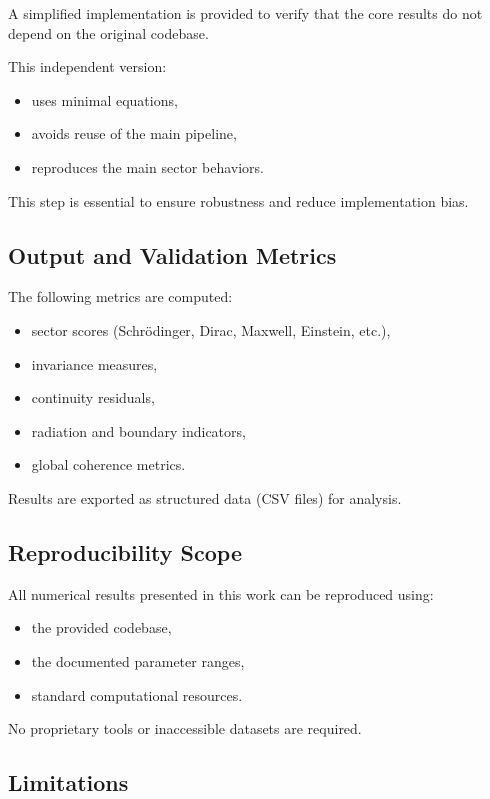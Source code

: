\documentclass[11pt]{article}
\begin{document}
A simplified implementation is provided to verify that the core results do not depend on the original codebase.

This independent version:

\begin{itemize}
\item uses minimal equations,
\item avoids reuse of the main pipeline,
\item reproduces the main sector behaviors.
\end{itemize}

This step is essential to ensure robustness and reduce implementation bias.

\subsection{Output and Validation Metrics}

The following metrics are computed:

\begin{itemize}
\item sector scores (Schrödinger, Dirac, Maxwell, Einstein, etc.),
\item invariance measures,
\item continuity residuals,
\item radiation and boundary indicators,
\item global coherence metrics.
\end{itemize}

Results are exported as structured data (CSV files) for analysis.

\subsection{Reproducibility Scope}

All numerical results presented in this work can be reproduced using:

\begin{itemize}
\item the provided codebase,
\item the documented parameter ranges,
\item standard computational resources.
\end{itemize}

No proprietary tools or inaccessible datasets are required.

\subsection{Limitations}
\end{document}

